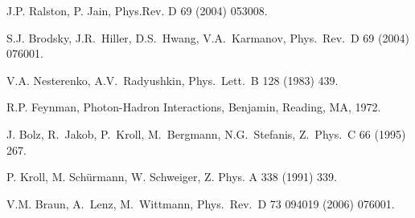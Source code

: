 \begin{thebibliography}{PPV06}
J.P. Ralston, P. Jain, Phys.Rev. D  69 (2004) 053008.

  S.J. Brodsky, J.R.~Hiller, D.S.~Hwang, V.A.~Karmanov,
  Phys.\ Rev.\ D  69 (2004) 076001.

  V.A. Nesterenko, A.V.~Radyushkin,
  Phys.\ Lett.\ B  128 (1983) 439.

R.P. Feynman, Photon-Hadron Interactions, Benjamin, Reading, MA, 1972.

  J. Bolz, R.~Jakob, P.~Kroll, M.~Bergmann, N.G.~Stefanis,
  Z.\ Phys.\ C  66 (1995) 267.

P. Kroll, M. Sch\"urmann, W. Schweiger, Z. Phys. A  338 (1991) 339.

  V.M. Braun, A.~Lenz, M.~Wittmann,
  Phys.\ Rev.\ D  73 094019 (2006) 076001.




\end{thebibliography}
%

